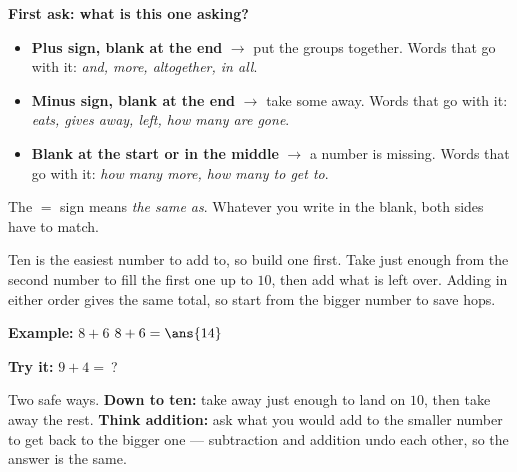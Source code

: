 \documentclass[12pt]{article}
\begin{document}

\begin{formulabox}
\textbf{First ask: what is this one asking?}
\begin{itemize}[leftmargin=0.8cm, itemsep=1pt, topsep=2pt]
\item \textbf{Plus sign, blank at the end} $\rightarrow$ put the groups
together. Words that go with it: \emph{and, more, altogether, in all}.
\item \textbf{Minus sign, blank at the end} $\rightarrow$ take some away. Words
that go with it: \emph{eats, gives away, left, how many are gone}.
\item \textbf{Blank at the start or in the middle} $\rightarrow$ a number is
missing. Words that go with it: \emph{how many more, how many to get to}.
\end{itemize}
The $=$ sign means \emph{the same as}. Whatever you write in the blank, both
sides have to match.
\end{formulabox}


\begin{formulabox}
Ten is the easiest number to add to, so build one first. Take just enough from
the second number to fill the first one up to $10$, then add what is left over.
Adding in either order gives the same total, so start from the bigger number to
save hops.
\end{formulabox}

\begin{examplebox}
\textbf{Example:} $8 + 6$
$8 + 6 = \ans{14}$
\end{examplebox}

\begin{tryitbox}
\textbf{Try it:} $9 + 4 = \ $?\\[2pt]
\end{tryitbox}


\begin{formulabox}
Two safe ways. \textbf{Down to ten:} take away just enough to land on $10$,
then take away the rest. \textbf{Think addition:} ask what you would add to the
smaller number to get back to the bigger one --- subtraction and addition undo
each other, so the answer is the same.
\end{formulabox}
\end{document}

